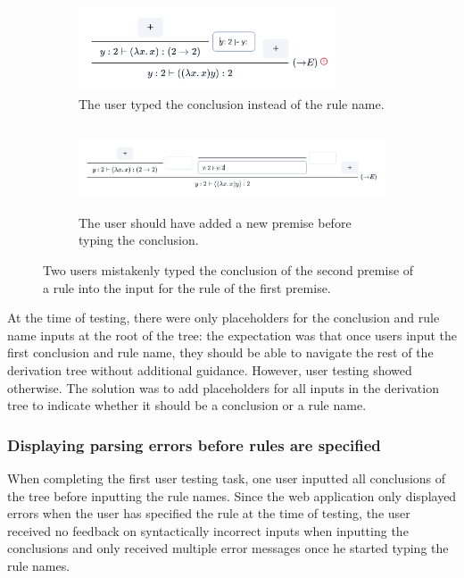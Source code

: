 \begin{figure}[!htbp]
    \centering
    \begin{subfigure}{\textwidth}
        \centering
        \includegraphics[height=2.5cm]{evaluation/premise-input-wrong.png}
        \caption{The user typed the conclusion instead of the rule name.}
    \end{subfigure}%
    \newline
    \begin{subfigure}{\textwidth}
        \centering
        \includegraphics[height=2.5cm]{evaluation/premise-input-correct.png}
        \caption{The user should have added a new premise before typing the conclusion.}
    \end{subfigure}
    \caption{Two users mistakenly typed the conclusion of the second premise of a rule into the input for the rule of the first premise.}
    \label{fig:evaluation:wrong-premise-input}
\end{figure}

At the time of testing, there were only placeholders for the conclusion and rule name inputs at the root of the tree: the expectation was that once users input the first conclusion and rule name, they should be able to navigate the rest of the derivation tree without additional guidance. However, user testing showed otherwise. The solution was to add placeholders for all inputs in the derivation tree to indicate whether it should be a conclusion or a rule name.

\subsubsection{Displaying parsing errors before rules are specified}
When completing the first user testing task, one user inputted all conclusions of the tree before inputting the rule names. Since the web application only displayed errors when the user has specified the rule at the time of testing, the user received no feedback on syntactically incorrect inputs when inputting the conclusions and only received multiple error messages once he started typing the rule names.

